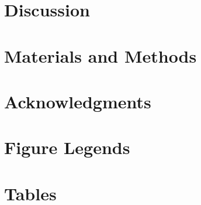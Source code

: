 \documentclass[10pt]{article}
\begin{document}
\section*{Discussion}

\section*{Materials and Methods}

\section*{Acknowledgments}




\section*{Figure Legends}


\section*{Tables}





\end{document}

